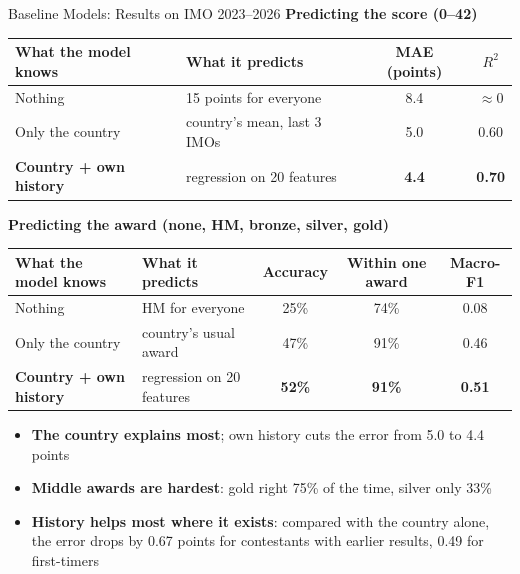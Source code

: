 \documentclass[aspectratio=169]{beamer}
\begin{document}
\begin{frame}{Baseline Models: Results on IMO 2023--2026}
  \scriptsize
  \setlength{\tabcolsep}{5pt}
  \renewcommand{\arraystretch}{1.1}
  \textbf{\footnotesize Predicting the score (0--42)}

  \vspace{2pt}
  \begin{tabular}{L{3.6cm}L{4.4cm}cc}
    \toprule
    \textbf{What the model knows} & \textbf{What it predicts} & \textbf{MAE (points)} & \textbf{$R^2$} \\
    \midrule
    Nothing                         & 15 points for everyone                   & 8.4 & $\approx 0$ \\
    Only the country                & country's mean, last 3 IMOs             & 5.0 & 0.60 \\
    \textbf{Country + own history}  & regression on 20 features                & \textbf{4.4} & \textbf{0.70} \\
    \bottomrule
  \end{tabular}

  \vspace{8pt}
  \textbf{\footnotesize Predicting the award (none, HM, bronze, silver, gold)}

  \vspace{2pt}
  \begin{tabular}{L{3.6cm}L{4.0cm}ccc}
    \toprule
    \textbf{What the model knows} & \textbf{What it predicts} & \textbf{Accuracy} & \textbf{Within one award} & \textbf{Macro-F1} \\
    \midrule
    Nothing                         & HM for everyone                     & 25\% & 74\% & 0.08 \\
    Only the country                & country's usual award               & 47\% & 91\% & 0.46 \\
    \textbf{Country + own history}  & regression on 20 features           & \textbf{52\%} & \textbf{91\%} & \textbf{0.51} \\
    \bottomrule
  \end{tabular}

  \vspace{8pt}
  \footnotesize
  \begin{itemize}\setlength{\itemsep}{2pt}
    \item \textbf{The country explains most}; own history cuts the error from 5.0 to 4.4 points
    \item \textbf{Middle awards are hardest}: gold right 75\% of the time, silver only 33\%
    \item \textbf{History helps most where it exists}: compared with the country alone, the error
          drops by 0.67 points for contestants with earlier results, 0.49 for first-timers
  \end{itemize}
\end{frame}
\end{document}
